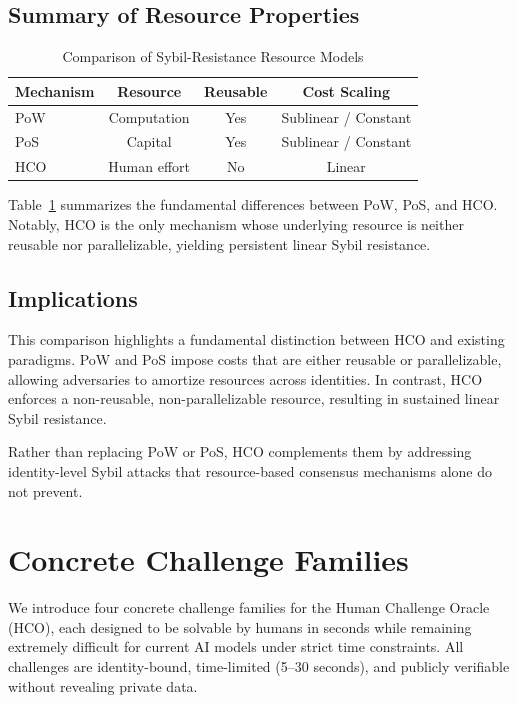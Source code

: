 \documentclass[sigconf,nonacm]{acmart}
\begin{document}
\subsection{Summary of Resource Properties}
\label{subsec:resource-summary}

\begin{table}[t]
	\centering
	\caption{Comparison of Sybil-Resistance Resource Models}
	\label{tab:resource-comparison}
	\begin{tabular}{lccc}
		\toprule
		Mechanism & Resource & Reusable & Cost Scaling \\
		\midrule
		PoW & Computation & Yes & Sublinear / Constant \\
		PoS & Capital & Yes & Sublinear / Constant \\
		HCO & Human effort & No & Linear \\
		\bottomrule
	\end{tabular}
\end{table}

\noindent
Table~\ref{tab:resource-comparison} summarizes the fundamental differences between
PoW, PoS, and HCO. Notably, HCO is the only mechanism whose underlying resource is
neither reusable nor parallelizable, yielding persistent linear Sybil resistance.

\subsection{Implications}
\label{subsec:resource-implications}

This comparison highlights a fundamental distinction between HCO and existing
paradigms. PoW and PoS impose costs that are either reusable or parallelizable,
allowing adversaries to amortize resources across identities. In contrast, HCO
enforces a non-reusable, non-parallelizable resource, resulting in sustained
linear Sybil resistance.

Rather than replacing PoW or PoS, HCO complements them by addressing
identity-level Sybil attacks that resource-based consensus mechanisms alone do
not prevent.


\section{Concrete Challenge Families}

We introduce four concrete challenge families for the Human Challenge Oracle (HCO), each designed to be solvable by humans in seconds while remaining extremely difficult for current AI models under strict time constraints. All challenges are identity-bound, time-limited (5--30 seconds), and publicly verifiable without revealing private data.
\end{document}
